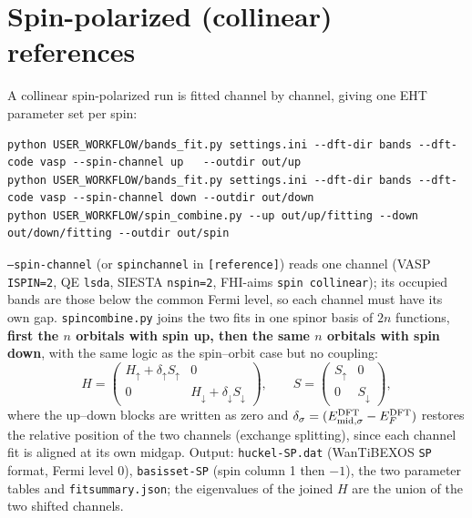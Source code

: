 \documentclass[11pt,a4paper]{article}
\newcommand{\cmd}[1]{\texttt{#1}}
\renewcommand{\_}{\origunderscore\allowbreak}
\begin{document}
\section{Spin-polarized (collinear) references}\label{sec:spin}
A collinear spin-polarized run is fitted channel by channel, giving one EHT parameter set per spin:
\begin{lstlisting}[style=sh]
python USER_WORKFLOW/bands_fit.py settings.ini --dft-dir bands --dft-code vasp --spin-channel up   --outdir out/up
python USER_WORKFLOW/bands_fit.py settings.ini --dft-dir bands --dft-code vasp --spin-channel down --outdir out/down
python USER_WORKFLOW/spin_combine.py --up out/up/fitting --down out/down/fitting --outdir out/spin
\end{lstlisting}
\cmd{--spin-channel} (or \cmd{spin\_channel} in \cmd{[reference]}) reads one channel (VASP \cmd{ISPIN=2}, QE \cmd{lsda},
SIESTA \cmd{nspin=2}, FHI-aims \cmd{spin collinear}); its occupied bands are those below the common Fermi level, so each
channel must have its own gap. \cmd{spin\_combine.py} joins the two fits in one spinor basis of $2n$ functions,
\textbf{first the $n$ orbitals with spin up, then the same $n$ orbitals with spin down}, with the same logic as the
spin--orbit case but no coupling:
\[
H=\begin{pmatrix}H_\uparrow+\delta_\uparrow S_\uparrow & 0\\ 0 & H_\downarrow+\delta_\downarrow S_\downarrow\end{pmatrix},\qquad
S=\begin{pmatrix}S_\uparrow & 0\\ 0 & S_\downarrow\end{pmatrix},
\]
where the up--down blocks are written as zero and $\delta_\sigma=(E^{\rm DFT}_{{\rm mid},\sigma}-E^{\rm DFT}_F)$ restores the
relative position of the two channels (exchange splitting), since each channel fit is aligned at its own midgap. Output:
\cmd{huckel-SP.dat} (WanTiBEXOS \cmd{SP} format, Fermi level 0), \cmd{basis\_set-SP} (spin column 1 then $-1$), the two
parameter tables and \cmd{fit\_summary.json}; the eigenvalues of the joined $H$ are the union of the two shifted channels.
\end{document}
